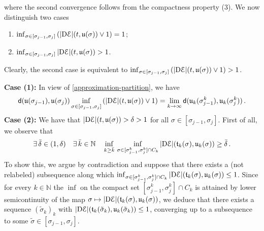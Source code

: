 \documentclass[a4paper,10pt,reqno]{amsart} %
\newcommand{\N}{\mathbb{N}}
\numberwithin{equation}{section}
\def\rmD{{\mathrm D}} \def\rmE{{\mathrm E}} \def\rmF{{\mathrm F}}
\newcommand{\md}[2]{\mathsf{d}(#1,#2)}
\newcommand{\slope}[3]{|\rmD {#1}|(#2,#3)}
\newcommand{\ninvresc}[1]{\mathfrak{t}_{#1}}
\newcommand{\invcur}[1]{\mathfrak{u}_{#1}}
\newcommand{\invcu}{\mathfrak{u}}
\newcommand{\RRR}{\color{red}}
\newcommand{\EEE}{\color{black}}
\begin{document}
where the second convergence  follows from   the compactness property (3).
  We  now distinguish two cases
  \begin{enumerate}
  \item $  \inf_{\sigma \in [\sigma_{j-1},\sigma_j]}\left( \slope \calE t{\invcu(\sigma)} \vee 1 \right)= 1 $;
  \item   $   \inf_{\sigma \in [\sigma_{j-1},\sigma_j]}\slope \calE t{\invcu(\sigma)}   > 1 $. 
    \end{enumerate} 
    Clearly, the second case is equivalent to $\inf_{\sigma \in [\sigma_{j-1},\sigma_j]}\left( \slope \calE t{\invcu(\sigma)} \vee 1 \right)  > 1$.
 
  
  \noindent
\textbf{Case (1):} 
  In view  of \eqref{approximation-partition}, we have
\begin{equation}
\label{ingredient-step-1}
 \md{\invcu(\sigma_{j-1})}{\invcu(\sigma_j)}  \inf_{\sigma \in [\sigma_{j-1},\sigma_j]}\left( \slope \calE t{\invcu(\sigma)} \vee 1 \right)  =   \lim_{k\to\infty} \md{\invcur k(\sigma_{j-1}^k)}{\invcur k(\sigma_j^k)}\,.
\end{equation}
\textbf{Case (2):}    We have that $\slope \calE t{\invcu(\sigma)}> \delta>1$ for all 
$\sigma \in [\sigma_{j-1},\sigma_j]$.  First of all, we observe that 
\begin{equation}
\label{claim-one}
 \exists\, \bar{\delta} \in (1,\delta) \quad 
\exists\, \bar{k}\in \N %
\quad  \inf_{k \geq \bar{k}}\,  \inf_{\sigma \in  [\sigma_{j-1}^k,\sigma_j^k] {\cap} C_k}
\slope \calE {\ninvresc k (\sigma)}{\invcur k(\sigma)} \geq \bar\delta\,. 
\end{equation}
To show this, we argue by contradiction and suppose that there exists a (not relabeled) subsequence  along which $ \inf_{\sigma \in  [\sigma_{j-1}^k,\sigma_j^k] \cap C_k}
\slope \calE {\ninvresc k (\sigma)}{\invcur k(\sigma)} \leq1$. Since for every $k\in \N$ the $\inf$ 
 on the compact set $[\sigma_{j-1}^k,\sigma_j^k] \cap C_k$  
is attained by lower semicontinuity of the map $\sigma \mapsto \slope \calE {\ninvresc k (\sigma)}{\invcur k(\sigma)}$, we deduce that there exists a sequence $(\tilde{\sigma}_k )_k$ with $\slope \calE {\ninvresc k (\tilde{\sigma}_k)}{\invcur k(\tilde{\sigma}_k)} \leq1$, converging up to a subsequence to some $\tilde \sigma \in  [\sigma_{j-1},\sigma_j]$. 
\end{document}
